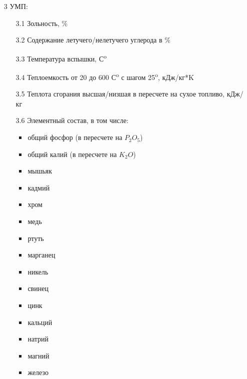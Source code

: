 \documentclass[russian,utf8]{eskdtext}
\begin{document}
\begin{enumerate}
   \item[3] УМП:
      \begin{enumerate}
      \item[3.1] Зольность, \%
      \item[3.2] Содержание летучего/нелетучего углерода в \%
      \item[3.3] Температура вспышки, С\textsuperscript{o}
      \item[3.4] Теплоемкость от 20 до 600 С\textsuperscript{o} с шагом 25\textsuperscript{o}, кДж/кг*K
      \item[3.5] Теплота сгорания высшая/низшая в пересчете на сухое топливо, кДж/кг
      \item[3.6] Элементный состав, в том числе:
         \begin{itemize}
         \item общий фосфор (в пересчете на  $P_{2}O_{5}$)
         \item общий калий (в пересчете на  $K_{2}O$)
         \item мышьяк
         \item кадмий
         \item хром
         \item медь
         \item ртуть
         \item марганец
         \item никель
         \item свинец
         \item цинк
         \item кальций
         \item натрий
         \item магний
         \item железо
         \end{itemize}
      \end{enumerate}   
      

\end{enumerate}
\end{document}
